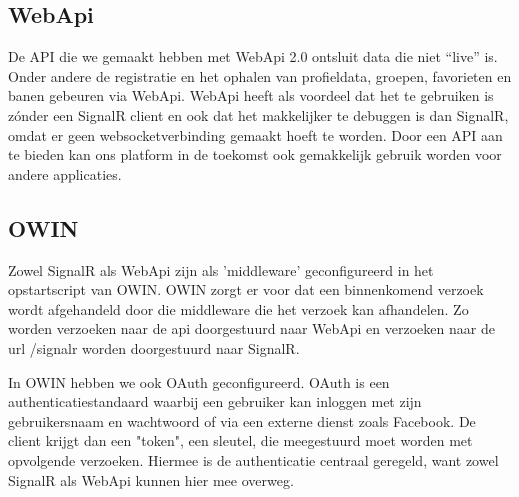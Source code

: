 \subsection{WebApi}
De API die we gemaakt hebben met WebApi 2.0 ontsluit data die niet ``live'' is. Onder andere de registratie en het ophalen van profieldata, groepen, favorieten en banen gebeuren via WebApi. WebApi heeft als voordeel dat het te gebruiken is zónder een SignalR client en ook dat het makkelijker te debuggen is dan SignalR, omdat er geen  websocketverbinding gemaakt hoeft te worden. Door een API aan te bieden kan ons platform in de toekomst ook gemakkelijk gebruik worden voor andere applicaties.

\subsection{OWIN}
Zowel SignalR als WebApi zijn als 'middleware' geconfigureerd in het opstartscript van OWIN. OWIN zorgt er voor dat een binnenkomend verzoek wordt afgehandeld door die middleware die het verzoek kan afhandelen. Zo worden verzoeken naar de api doorgestuurd naar WebApi en verzoeken naar de url /signalr worden doorgestuurd naar SignalR. 

In OWIN hebben we ook OAuth geconfigureerd. OAuth is een authenticatiestandaard waarbij een gebruiker kan inloggen met zijn gebruikersnaam en wachtwoord of via een externe dienst zoals Facebook. De client krijgt dan een "token", een sleutel, die meegestuurd moet worden met opvolgende verzoeken. Hiermee is de authenticatie centraal geregeld, want zowel SignalR als WebApi kunnen hier mee overweg.